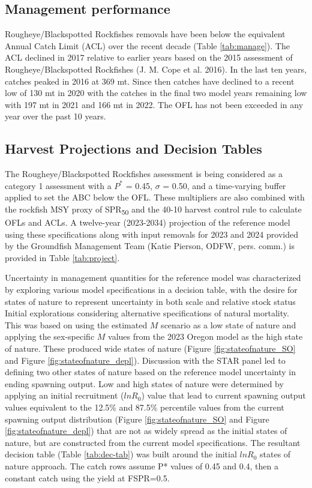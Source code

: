 \documentclass[
]{scrartcl}
\begin{document}
\subsection{Management performance}\label{management-performance-2}

Rougheye/Blackspotted Rockfishes removals have been below the equivalent
Annual Catch Limit (ACL) over the recent decade (Table
\ref{tab:manage}). The ACL declined in 2017 relative to earlier years
based on the 2015 assessment of Rougheye/Blackspotted Rockfishes (J. M.
Cope et al. 2016). In the last ten years, catches peaked in 2016 at 369
mt. Since then catches have declined to a recent low of 130 mt in 2020
with the catches in the final two model years remaining low with 197 mt
in 2021 and 166 mt in 2022. The OFL has not been exceeded in any year
over the past 10 years.

\subsection{Harvest Projections and Decision
Tables}\label{harvest-projections-and-decision-tables-1}

The Rougheye/Blackspotted Rockfishes assessment is being considered as a
category 1 assessment with a \(P^*\) = 0.45, \(\sigma\) = 0.50, and a
time-varying buffer applied to set the ABC below the OFL. These
multipliers are also combined with the rockfish MSY proxy of
SPR\textsubscript{50} and the 40-10 harvest control rule to calculate
OFLs and ACLs. A twelve-year (2023-2034) projection of the reference
model using these specifications along with input removals for 2023 and
2024 provided by the Groundfish Management Team (Katie Pierson, ODFW,
pers. comm.) is provided in Table \ref{tab:project}.

Uncertainty in management quantities for the reference model was
characterized by exploring various model specifications in a decision
table, with the desire for states of nature to represent uncertainty in
both scale and relative stock status Initial explorations considering
alternative specifications of natural mortality. This was based on using
the estimated \(M\) scenario as a low state of nature and applying the
sex-specific \(M\) values from the 2023 Oregon model as the high state
of nature. These produced wide states of nature (Figure
\ref{fig:stateofnature_SO} and Figure \ref{fig:stateofnature_depl}).
Discussion with the STAR panel led to defining two other states of
nature based on the reference model uncertainty in ending spawning
output. Low and high states of nature were determined by applying an
initial recruitment (\(lnR_0\)) value that lead to current spawning
output values equivalent to the 12.5\% and 87.5\% percentile values from
the current spawning output distribution (Figure
\ref{fig:stateofnature_SO} and Figure \ref{fig:stateofnature_depl}) that
are not as widely spread as the initial states of nature, but are
constructed from the current model specifications. The resultant
decision table (Table \ref{tab:dec-tab}) was built around the initial
\(lnR_0\) states of nature approach. The catch rows assume P* values of
0.45 and 0.4, then a constant catch using the yield at FSPR=0.5.
\end{document}
